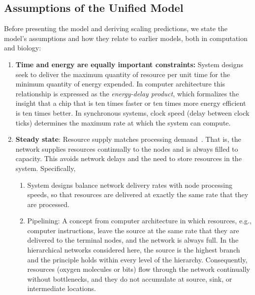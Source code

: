 \documentclass[12pt]{article}
\begin{document}
\subsection{Assumptions of the Unified Model}
\label{sec:assumptions}

Before presenting the model and deriving scaling predictions, we state the
model's assumptions and how they relate to earlier models, both in
computation and biology:

\begin{enumerate}
\item {\bf Time and energy are equally important constraints:} 
  System designs seek to deliver the maximum quantity of
  resource per unit time for the minimum quantity of energy expended. 
  In computer architecture this relationship is expressed as the
  \emph{energy-delay product}, which formalizes the insight that a
  chip that is ten times faster or ten times more energy efficient is
  ten times better.   In synchronous systems, clock speed (delay
  between clock ticks) determines the maximum rate at which the system can compute.

\item {\bf Steady state}: Resource supply matches processing
  demand~\cite{banavar10}.  That is, the network supplies resources continually
  to the nodes and is always filled to capacity.  This avoids network
  delays and the need to store resources in the system. Specifically,

  \begin{enumerate}

\item System designs balance network delivery rates with node processing
  speeds, so that resources are delivered at exactly the same rate that they
  are processed.

\item Pipelining: A concept from computer architecture in which resources,
  e.g., computer instructions, leave the source at the same rate that they are
  delivered to the terminal nodes, and the network is always full.  In the
  hierarchical networks considered here, the source is the highest branch
  and the principle holds within every level of the hierarchy.
  Consequently, resources (oxygen molecules or bits) flow through the network continually 
  without bottlenecks, and they do not accumulate at source, sink, or intermediate locations.
  \end{enumerate}


\end{enumerate}
\end{document}
